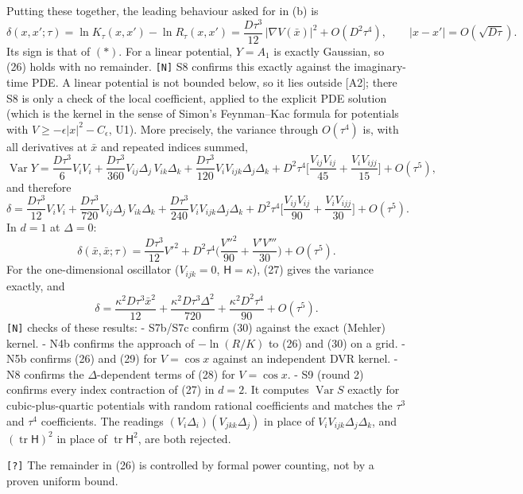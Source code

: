 \documentclass[11pt,a4paper]{article}
\begin{document}
Putting these together, the leading behaviour asked for in (b) is
\[\delta(x,x';\tau)=\ln K_\tau(x,x')-\ln R_\tau(x,x')=\frac{D\tau^3}{12}\,\big|\nabla V(\bar x)\big|^2+O(D^2\tau^4),\qquad|x-x'|=O(\sqrt{D\tau}).\tag{26}\]
Its sign is that of \((\ast)\). For a linear potential, \(Y=A_1\) is exactly Gaussian, so (26) holds with no remainder. \texttt{[N]} S8 confirms this exactly against the imaginary-time PDE. A linear potential is not bounded below, so it lies outside {[}A2{]}; there S8 is only a check of the local coefficient, applied to the explicit PDE solution (which is the kernel in the sense of Simon's Feynman--Kac formula for potentials with \(V\ge-\epsilon|x|^2-C_\epsilon\), U1). More precisely, the variance through \(O(\tau^4)\) is, with all derivatives at \(\bar x\) and repeated indices summed,
\[\operatorname{Var}Y=\frac{D\tau^3}6V_iV_i+\frac{D\tau^3}{360}V_{ij}\Delta_j\,V_{ik}\Delta_k+\frac{D\tau^3}{120}V_iV_{ijk}\Delta_j\Delta_k+D^2\tau^4\Big[\frac{V_{ij}V_{ij}}{45}+\frac{V_iV_{ijj}}{15}\Big]+O(\tau^5),\tag{27}\]
and therefore
\[\delta=\frac{D\tau^3}{12}V_iV_i+\frac{D\tau^3}{720}V_{ij}\Delta_j\,V_{ik}\Delta_k+\frac{D\tau^3}{240}V_iV_{ijk}\Delta_j\Delta_k+D^2\tau^4\Big[\frac{V_{ij}V_{ij}}{90}+\frac{V_iV_{ijj}}{30}\Big]+O(\tau^5).\tag{28}\]
In \(d=1\) at \(\Delta=0\):
\[\delta(\bar x,\bar x;\tau)=\frac{D\tau^3}{12}V'^2+D^2\tau^4\Big(\frac{V''^2}{90}+\frac{V'V'''}{30}\Big)+O(\tau^5).\tag{29}\]
For the one-dimensional oscillator (\(V_{ijk}=0\), \(\mathsf H=\kappa\)), (27) gives the variance exactly, and
\[\delta=\frac{\kappa^2D\tau^3\bar x^2}{12}+\frac{\kappa^2D\tau^3\Delta^2}{720}+\frac{\kappa^2D^2\tau^4}{90}+O(\tau^5).\tag{30}\]
\texttt{[N]} checks of these results:
- S7b/S7c confirm (30) against the exact (Mehler) kernel.
- N4b confirms the approach of \(-\ln(R/K)\) to (26) and (30) on a grid.
- N5b confirms (26) and (29) for \(V=\cos x\) against an independent DVR kernel.
- N8 confirms the \(\Delta\)-dependent terms of (28) for \(V=\cos x\).
- S9 (round 2) confirms every index contraction of (27) in \(d=2\). It computes \(\operatorname{Var}S\) exactly for cubic-plus-quartic potentials with random rational coefficients and matches the \(\tau^3\) and \(\tau^4\) coefficients. The readings \((V_i\Delta_i)(V_{jkk}\Delta_j)\) in place of \(V_iV_{ijk}\Delta_j\Delta_k\), and \((\operatorname{tr}\mathsf H)^2\) in place of \(\operatorname{tr}\mathsf H^2\), are both rejected.

\texttt{[?]} The remainder in (26) is controlled by formal power counting, not by a proven uniform bound.
\end{document}
